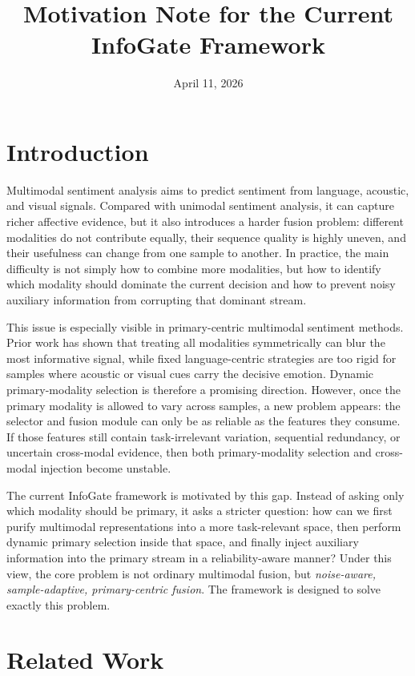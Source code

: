\documentclass[11pt]{article}
\title{Motivation Note for the Current InfoGate Framework}
\author{}
\date{April 11, 2026}
\begin{document}
\maketitle

\section{Introduction}

Multimodal sentiment analysis aims to predict sentiment from language,
acoustic, and visual signals. Compared with unimodal sentiment analysis, it can
capture richer affective evidence, but it also introduces a harder fusion
problem: different modalities do not contribute equally, their sequence quality
is highly uneven, and their usefulness can change from one sample to another.
In practice, the main difficulty is not simply how to combine more modalities,
but how to identify which modality should dominate the current decision and how
to prevent noisy auxiliary information from corrupting that dominant stream.

This issue is especially visible in primary-centric multimodal sentiment
methods. Prior work has shown that treating all modalities symmetrically can
blur the most informative signal, while fixed language-centric strategies are
too rigid for samples where acoustic or visual cues carry the decisive emotion.
Dynamic primary-modality selection is therefore a promising direction.
However, once the primary modality is allowed to vary across samples, a new
problem appears: the selector and fusion module can only be as reliable as the
features they consume. If those features still contain task-irrelevant
variation, sequential redundancy, or uncertain cross-modal evidence, then both
primary-modality selection and cross-modal injection become unstable.

The current InfoGate framework is motivated by this gap. Instead of asking only
which modality should be primary, it asks a stricter question: how can we
first purify multimodal representations into a more task-relevant space, then
perform dynamic primary selection inside that space, and finally inject
auxiliary information into the primary stream in a reliability-aware manner?
Under this view, the core problem is not ordinary multimodal fusion, but
\emph{noise-aware, sample-adaptive, primary-centric fusion}. The framework is
designed to solve exactly this problem.

\section{Related Work}
\end{document}
